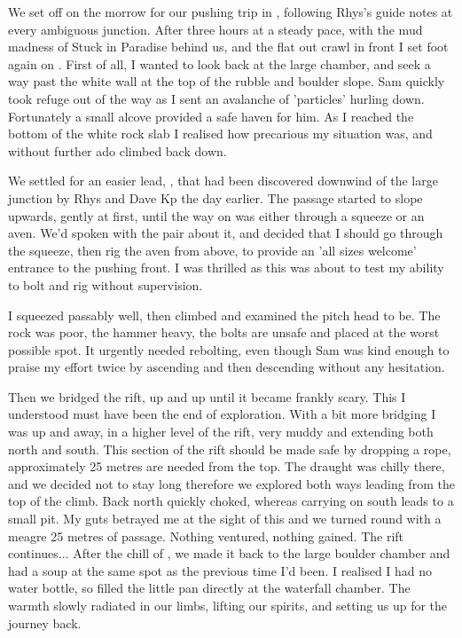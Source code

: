 We set off on the morrow for our pushing trip in , following Rhys's guide notes at every ambiguous junction. After three hours at a steady pace, with the mud madness of Stuck in Paradise behind us, and the flat out crawl in front I set foot again on .
First of all, I wanted to look back at the large chamber, and seek a way past the white wall at the top of the rubble and boulder slope. Sam quickly took refuge out of the way as I sent an avalanche of 'particles' hurling down. Fortunately a small alcove provided a safe haven for him. As I reached the bottom of the white rock slab I realised how precarious my situation was, and without further ado climbed back down.

We settled for an easier lead, , that had been discovered downwind of the large junction by Rhys and Dave Kp the day earlier. The passage started to slope upwards, gently at first, until the way on was either through a squeeze or an aven. We'd spoken with the pair about it, and decided that I should go through the squeeze, then rig the aven from above, to provide an 'all sizes welcome' entrance to the pushing front. I was thrilled as this was about to test my ability to bolt and rig without supervision.

I squeezed passably well, then climbed and examined the pitch head to be. The rock was poor, the hammer heavy, the bolts are unsafe and placed at the worst possible spot. It urgently needed rebolting, even though Sam was kind enough to praise my effort twice by ascending and then descending without any hesitation.

Then we bridged the rift, up and up until it became frankly scary. This I understood must have been the end of exploration. With a bit more bridging I was up and away, in a higher level of the rift, very muddy and extending both north and south. This section of the rift should be made safe by dropping a rope, approximately 25 metres are needed from the top. The draught was chilly there, and we decided not to stay long therefore we explored both ways leading from the top of the climb. Back north quickly choked, whereas carrying on south leads to a small pit. My guts betrayed me at the sight of this and we turned round with a meagre 25 metres of passage. Nothing ventured, nothing gained. The rift continues... After the chill of , we made it back to the large boulder chamber and had a soup at the same spot as the previous time I'd been. I realised I had no water bottle, so filled the little pan directly at the waterfall chamber. The warmth slowly radiated in our limbs, lifting our spirits, and setting us up for the journey back.

